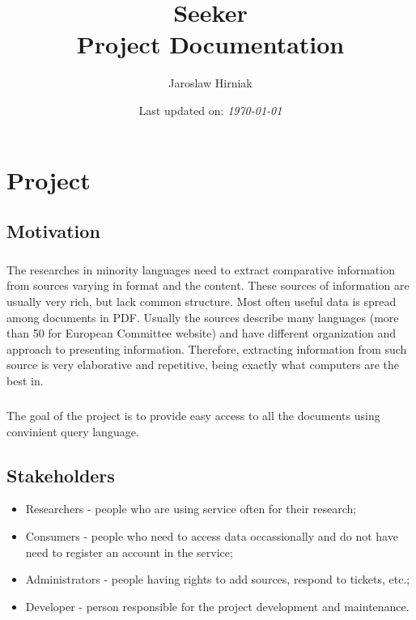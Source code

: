 \documentclass[11pt, a4paper]{report}
\title{\textbf{Seeker\\Project Documentation}}
\author{Jaroslaw Hirniak}
\date{Last updated on: \emph{\today}}
\begin{document}
\maketitle

\tableofcontents

\chapter{Project}
 
\section{Motivation}
\paragraph{}
The researches in minority languages need to extract comparative information from sources varying in format and the content. These sources of information are usually very rich, but lack common structure. Most often useful data is spread among documents in PDF. Usually the sources describe many languages (more than 50 for European Committee website) and have different organization and approach to presenting information. Therefore, extracting information from such source is very elaborative and repetitive, being exactly what computers are the best in.

\paragraph{}
The goal of the project is to provide easy access to all the documents using convinient query language.

\section{Stakeholders}

\begin{itemize}
  \item Researchers - people who are using service often for their research;
  \item Consumers - people who need to access data occassionally and do not have need to register an account in the service;
  \item Administrators - people having rights to add sources, respond to tickets, etc.;
  \item Developer - person responsible for the project development and maintenance.
\end{itemize}
\end{document}
